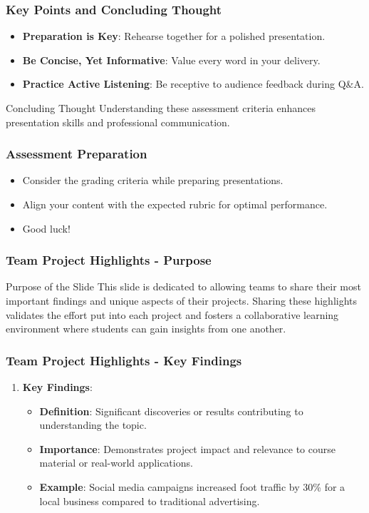\documentclass{beamer}
\begin{document}
\begin{frame}[fragile]
    \frametitle{Key Points and Concluding Thought}
    \begin{itemize}
        \item \textbf{Preparation is Key}: Rehearse together for a polished presentation.
        \item \textbf{Be Concise, Yet Informative}: Value every word in your delivery.
        \item \textbf{Practice Active Listening}: Be receptive to audience feedback during Q\&A.
    \end{itemize}
    
    \begin{block}{Concluding Thought}
        Understanding these assessment criteria enhances presentation skills and professional communication.
    \end{block}
\end{frame}

\begin{frame}[fragile]
    \frametitle{Assessment Preparation}
    \begin{itemize}
        \item Consider the grading criteria while preparing presentations.
        \item Align your content with the expected rubric for optimal performance.
        \item Good luck!
    \end{itemize}
\end{frame}

\begin{frame}[fragile]
    \frametitle{Team Project Highlights - Purpose}
    \begin{block}{Purpose of the Slide}
        This slide is dedicated to allowing teams to share their most important findings and unique aspects of their projects. Sharing these highlights validates the effort put into each project and fosters a collaborative learning environment where students can gain insights from one another.
    \end{block}
\end{frame}

\begin{frame}[fragile]
    \frametitle{Team Project Highlights - Key Findings}
    \begin{enumerate}
        \item \textbf{Key Findings}:
            \begin{itemize}
                \item \textbf{Definition}: Significant discoveries or results contributing to understanding the topic.
                \item \textbf{Importance}: Demonstrates project impact and relevance to course material or real-world applications.
                \item \textbf{Example}: Social media campaigns increased foot traffic by 30\% for a local business compared to traditional advertising.
            \end{itemize}
    \end{enumerate}
\end{frame}
\end{document}
